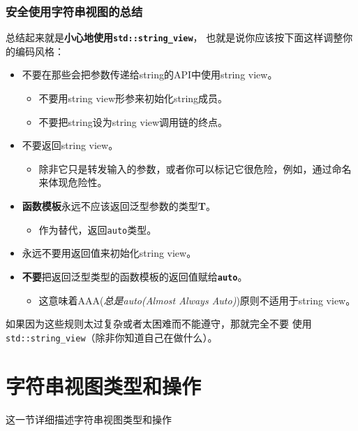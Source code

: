 \subsubsection{安全使用字符串视图的总结}
总结起来就是\textbf{小心地使用\texttt{std::string\_view}}，
也就是说你应该按下面这样调整你的编码风格：
\begin{itemize}
    \item 不要在那些会把参数传递给string的API中使用string view。
    \begin{itemize}
        \item 不要用string view形参来初始化string成员。
        \item 不要把string设为string view调用链的终点。
    \end{itemize}
    \item 不要返回string view。
    \begin{itemize}
        \item 除非它只是转发输入的参数，或者你可以标记它很危险，例如，通过命名来体现危险性。
    \end{itemize}
    \item \textbf{函数模板}永远不应该返回泛型参数的类型\textbf{T}。
    \begin{itemize}
        \item 作为替代，返回\texttt{auto}类型。
    \end{itemize}
    \item 永远不要用返回值来初始化string view。
    \item \textbf{不要}把返回泛型类型的函数模板的返回值赋给\textbf{\texttt{auto}}。
    \begin{itemize}
        \item 这意味着AAA(\emph{总是auto(Almost Always Auto)})原则不适用于string view。
    \end{itemize}
\end{itemize}
如果因为这些规则太过复杂或者太困难而不能遵守，那就完全不要
使用\texttt{std::string\_view}（除非你知道自己在做什么）。


\section{字符串视图类型和操作}
这一节详细描述字符串视图类型和操作

